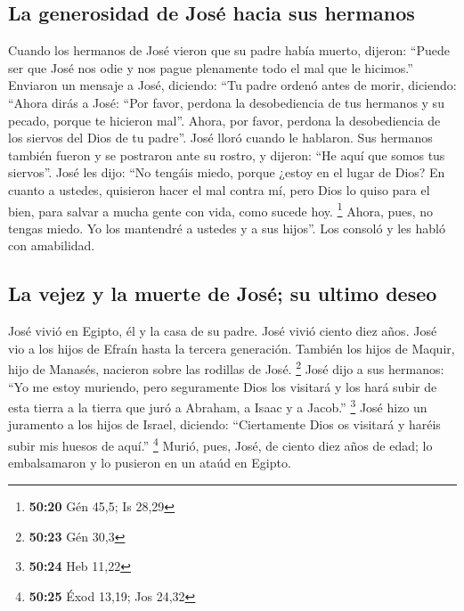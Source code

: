 \begin{paracol}{2}
\hypertarget{la-generosidad-de-josuxe9-hacia-sus-hermanos}{%
\subsection{La generosidad de José hacia sus
hermanos}\label{la-generosidad-de-josuxe9-hacia-sus-hermanos}}

 Cuando los hermanos de José vieron que su padre había
muerto, dijeron: ``Puede ser que José nos odie y nos pague plenamente
todo el mal que le hicimos.''  Enviaron un mensaje a
José, diciendo: ``Tu padre ordenó antes de morir, diciendo:
 ``Ahora dirás a José: ``Por favor, perdona la
desobediencia de tus hermanos y su pecado, porque te hicieron mal''.
Ahora, por favor, perdona la desobediencia de los siervos del Dios de tu
padre''. José lloró cuando le hablaron.  Sus hermanos
también fueron y se postraron ante su rostro, y dijeron: ``He aquí que
somos tus siervos''.  José les dijo: ``No tengáis miedo,
porque ¿estoy en el lugar de Dios?  En cuanto a ustedes,
quisieron hacer el mal contra mí, pero Dios lo quiso para el bien, para
salvar a mucha gente con vida, como sucede hoy. \footnote{\textbf{50:20}
  Gén 45,5; Is 28,29}  Ahora, pues, no tengas miedo. Yo
los mantendré a ustedes y a sus hijos''. Los consoló y les habló con
amabilidad.

\hypertarget{la-vejez-y-la-muerte-de-josuxe9-su-ultimo-deseo}{%
\subsection{La vejez y la muerte de José; su ultimo
deseo}\label{la-vejez-y-la-muerte-de-josuxe9-su-ultimo-deseo}}

 José vivió en Egipto, él y la casa de su padre. José
vivió ciento diez años.  José vio a los hijos de Efraín
hasta la tercera generación. También los hijos de Maquir, hijo de
Manasés, nacieron sobre las rodillas de José. \footnote{\textbf{50:23}
  Gén 30,3}  José dijo a sus hermanos: ``Yo me estoy
muriendo, pero seguramente Dios los visitará y los hará subir de esta
tierra a la tierra que juró a Abraham, a Isaac y a Jacob.'' \footnote{\textbf{50:24}
  Heb 11,22}  José hizo un juramento a los hijos de
Israel, diciendo: ``Ciertamente Dios os visitará y haréis subir mis
huesos de aquí.'' \footnote{\textbf{50:25} Éxod 13,19; Jos 24,32}
 Murió, pues, José, de ciento diez años de edad; lo
embalsamaron y lo pusieron en un ataúd en Egipto. \switchcolumn
\begin{otherlanguage}{english}


\end{otherlanguage}
\end{paracol}
